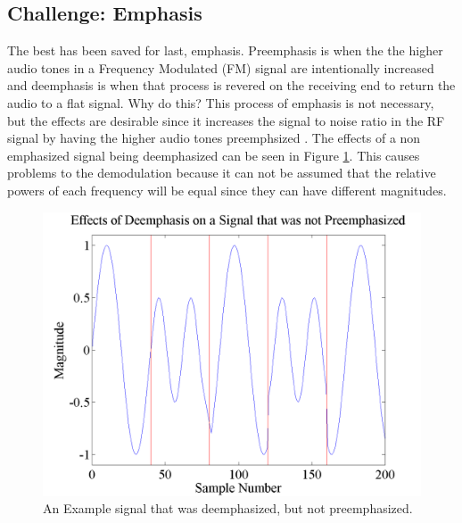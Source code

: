 \subsection{Challenge: Emphasis}
The best has been saved for last, emphasis. Preemphasis is when the the higher audio tones in a Frequency Modulated (FM) signal are intentionally increased and deemphasis is when that process is revered on the receiving end to return the audio to a flat signal. Why do this? This process of emphasis is not necessary, but the effects are desirable since it increases the signal to noise ratio in the RF signal by having the higher audio tones preemphsized \cite{Gibilisco1994}. The effects of a non emphasized signal being deemphasized can be seen in Figure \ref{emphasisExample}. This causes problems to the demodulation because it can not be assumed that the relative powers of each frequency will be equal since they can have different magnitudes. 
\begin{figure}
  \centering
	\includegraphics[width=0.75\linewidth]{images/EffectsofDeemphasisonaSignalthatwasnotpreemphasized.png} 
	\caption{An Example signal that was deemphasized, but not preemphasized.}
   \label{emphasisExample}
\end{figure}
